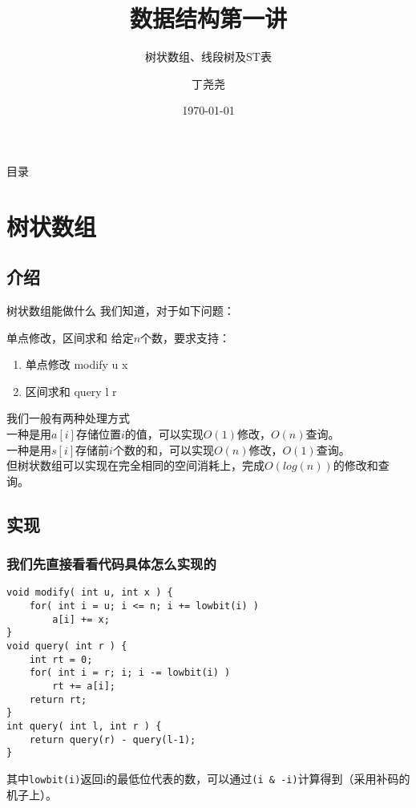 \documentclass{beamer}
\title{数据结构第一讲}
\subtitle{树状数组、线段树及ST表}
\author{丁尧尧}
\institute{上海交通大学}
\date{\today}
\begin{document}
	\maketitle
	\begin{frame}{目录}
		\tableofcontents
	\end{frame}
	
	\section{树状数组}
		\subsection{介绍}
			\begin{frame}{树状数组能做什么}
				我们知道，对于如下问题： \\
				\begin{block}{单点修改，区间求和} 
					给定$n$个数，要求支持：\\
					\begin{enumerate}
						\item 单点修改 modify u x
						\item 区间求和 query l r
					\end{enumerate}
				\end{block}
				我们一般有两种处理方式\\
				一种是用$a[i]$存储位置$i$的值，可以实现$O(1)$修改，$O(n)$查询。\\
				一种是用$s[i]$存储前$i$个数的和，可以实现$O(n)$修改，$O(1)$查询。\\
				但树状数组可以实现在完全相同的空间消耗上，完成$O(log(n))$的修改和查询。
			\end{frame}
		\subsection{实现}
			\begin{frame}[fragile=singleslide]
				\frametitle{我们先直接看看代码具体怎么实现的}
				\begin{verbatim}
void modify( int u, int x ) {
    for( int i = u; i <= n; i += lowbit(i) )
        a[i] += x;
}
void query( int r ) {
    int rt = 0;
    for( int i = r; i; i -= lowbit(i) )
        rt += a[i];
    return rt;
}
int query( int l, int r ) {
    return query(r) - query(l-1);
}
				\end{verbatim}
				其中\verb|lowbit(i)|返回i的最低位代表的数，可以通过\verb|(i & -i)|计算得到（采用补码的机子上）。
			\end{frame}
\end{document}
